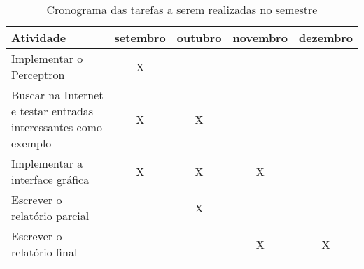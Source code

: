 \documentclass[brazil, a4paper]{article}
\begin{document}
\begin{table}
    \begin{tabular}{|p{5cm}|c|c|c|c|}
    \hline
    Atividade                                                       & setembro & outubro & novembro & dezembro \\ \hline
    Implementar o Perceptron                                        & X        & ~       & ~        & ~        \\
    Buscar na Internet e testar entradas interessantes como exemplo & X        & X       & ~        & ~        \\
    Implementar a interface gráfica                                 & X        & X       & X        & ~        \\
    Escrever o relatório parcial                                    & ~        & X       & ~        & ~        \\ 
    Escrever o relatório final                                      & ~        & ~       & X        & X        \\ \hline
    \end{tabular}
    \caption{Cronograma das tarefas a serem realizadas no semestre}
\end{table}
\end{document}
